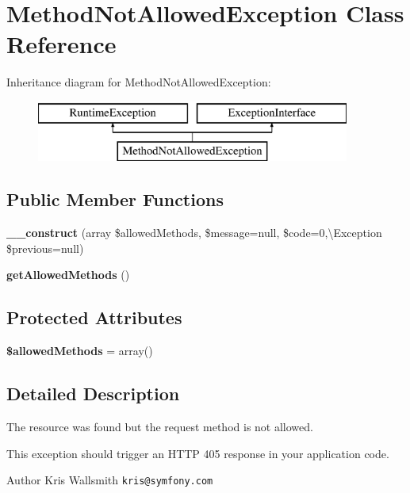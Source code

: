 \section{Method\+Not\+Allowed\+Exception Class Reference}
\label{class_symfony_1_1_component_1_1_routing_1_1_exception_1_1_method_not_allowed_exception}
Inheritance diagram for Method\+Not\+Allowed\+Exception\+:\begin{figure}[H]
\begin{center}
\leavevmode
\includegraphics[height=2.000000cm]{class_symfony_1_1_component_1_1_routing_1_1_exception_1_1_method_not_allowed_exception}
\end{center}
\end{figure}
\subsection*{Public Member Functions}
\begin{DoxyCompactItemize}
\item 
{\bf \+\_\+\+\_\+construct} (array \$allowed\+Methods, \$message=null, \$code=0,\textbackslash{}Exception \$previous=null)
\item 
{\bf get\+Allowed\+Methods} ()
\end{DoxyCompactItemize}
\subsection*{Protected Attributes}
\begin{DoxyCompactItemize}
\item 
{\bf \$allowed\+Methods} = array()
\end{DoxyCompactItemize}


\subsection{Detailed Description}
The resource was found but the request method is not allowed.

This exception should trigger an H\+T\+T\+P 405 response in your application code.

\begin{DoxyAuthor}{Author}
Kris Wallsmith {\tt kris@symfony.\+com}
\end{DoxyAuthor}


